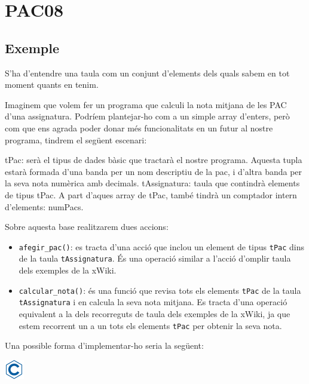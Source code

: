 \documentclass[]{book}
\providecommand{\tightlist}{%
  \setlength{\itemsep}{0pt}\setlength{\parskip}{0pt}}
\begin{document}
\chapter{PAC08}\label{pac08}

\section{Exemple}\label{exemple-2}

S'ha d'entendre una taula com un conjunt d'elements dels quals sabem en
tot moment quants en tenim.

Imaginem que volem fer un programa que calculi la nota mitjana de les
PAC d'una assignatura. Podríem plantejar-ho com a un simple array
d'enters, però com que ens agrada poder donar més funcionalitats en un
futur al nostre programa, tindrem el següent escenari:

tPac: serà el tipus de dades bàsic que tractarà el nostre programa.
Aquesta tupla estarà formada d'una banda per un nom descriptiu de la
pac, i d'altra banda per la seva nota numèrica amb decimals.
tAssignatura: taula que contindrà elements de tipus tPac. A part d'aques
array de tPac, també tindrà un comptador intern d'elements: numPacs.

Sobre aquesta base realitzarem dues accions:

\begin{itemize}
\tightlist
\item
  \texttt{afegir\_pac()}: es tracta d'una acció que inclou un element de
  tipus \texttt{tPac} dins de la taula \texttt{tAssignatura}. És una
  operació similar a l'acció d'omplir taula dels exemples de la xWiki.
\item
  \texttt{calcular\_nota()}: és una funció que revisa tots els elements
  \texttt{tPac} de la taula \texttt{tAssignatura} i en calcula la seva
  nota mitjana. Es tracta d'una operació equivalent a la dels
  recorreguts de taula dels exemples de la xWiki, ja que estem recorrent
  un a un tots els elements \texttt{tPac} per obtenir la seva nota.
\end{itemize}

Una possible forma d'implementar-ho seria la següent:

\includegraphics{./img/c.png}
\end{document}
